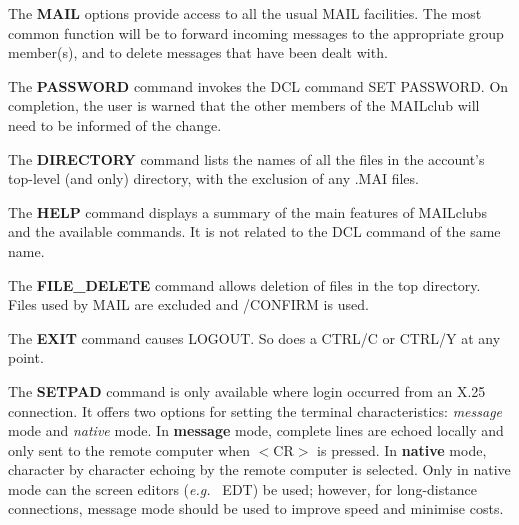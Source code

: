 The {\bf MAIL} options provide access to all the usual MAIL
facilities.  The most common function will be to forward
incoming messages to the appropriate group member(s), and
to delete messages that have been dealt with.

The {\bf PASSWORD} command invokes the DCL command SET PASSWORD.
On completion, the user is warned that the other members of the
MAILclub will need to be informed of the change.

The {\bf DIRECTORY} command lists the names of all the files in
the account's top-level (and only) directory, with the exclusion
of any .MAI files.

The {\bf HELP} command displays a summary of the main features of
MAILclubs and the available commands.  It is not related to the DCL
command of the same name.

The {\bf FILE\_DELETE} command allows deletion of files in the top
directory. Files used by MAIL are excluded and /CONFIRM is used.

The {\bf EXIT} command causes LOGOUT.  So does a CTRL/C or
CTRL/Y at any point.

The {\bf SETPAD} command is only available where login occurred from
an X.25 connection.  It offers two options for setting the
terminal characteristics: {\it message} mode and {\it native}
mode.  In {\bf message} mode,
complete lines are echoed locally and only sent to the remote
computer when $<$CR$>$ is pressed.  In {\bf native}
mode, character by
character echoing by the remote computer is selected.  Only in
native mode can the screen editors ({\it e.g.\ } EDT) be used;  however,
for long-distance connections, message mode should be used to
improve speed and minimise costs.



